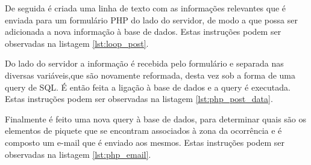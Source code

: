 De seguida é criada uma linha de texto com as informações relevantes que é enviada para um formulário PHP do lado do servidor, de modo a que possa ser adicionada a nova informação à base de dados. Estas instruções podem ser observadas na listagem \ref{lst:loop_post}.



Do lado do servidor a informação é recebida pelo formulário e separada nas diversas variáveis,que são novamente reformada, desta vez sob a forma de uma query de SQL. É então feita a ligação à base de dados e a query é executada. Estas instruções podem ser observadas na listagem \ref{lst:php_post_data}.



Finalmente é feito uma nova query à base de dados, para determinar quais são os elementos de piquete que se encontram associados à zona da ocorrência e é composto um e-mail que é enviado aos mesmos.  Estas instruções podem ser observadas na listagem \ref{lst:php_email}.



